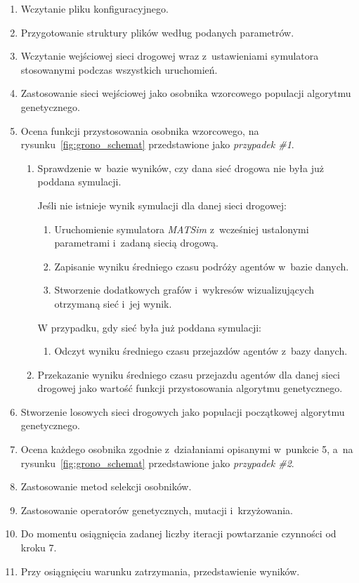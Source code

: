 \documentclass[twoside,12pt]{report}
\begin{document}
\begin{enumerate}
\item Wczytanie pliku konfiguracyjnego.
\item Przygotowanie struktury plików według podanych parametrów.
\item Wczytanie wejściowej sieci drogowej wraz z~ustawieniami symulatora stosowanymi podczas wszystkich uruchomień.
\item Zastosowanie sieci wejściowej jako osobnika wzorcowego populacji algorytmu genetycznego.
\item Ocena funkcji przystosowania osobnika wzorcowego, na rysunku~\ref{fig:grono_schemat} przedstawione jako \textit{przypadek \#1}.
\begin{enumerate}
\item Sprawdzenie w~bazie wyników, czy dana sieć drogowa nie była już poddana symulacji.

Jeśli nie istnieje wynik symulacji dla danej sieci drogowej:
\begin{enumerate}
\item Uruchomienie symulatora \textit{MATSim} z~wcześniej ustalonymi parametrami i~zadaną siecią drogową.
\item Zapisanie wyniku średniego czasu podróży agentów w~bazie danych.
\item Stworzenie dodatkowych grafów i~wykresów wizualizujących otrzymaną sieć i~jej wynik.
\end{enumerate}

W przypadku, gdy sieć była już poddana symulacji:
\begin{enumerate}
\item Odczyt wyniku średniego czasu przejazdów agentów z~bazy danych.
\end{enumerate}
\item Przekazanie wyniku średniego czasu przejazdu agentów dla danej sieci drogowej jako wartość funkcji przystosowania algorytmu genetycznego.
\end{enumerate}

\item Stworzenie losowych sieci drogowych jako populacji początkowej algorytmu genetycznego.
\item Ocena każdego osobnika zgodnie z~działaniami opisanymi w~punkcie 5, a~na rysunku~\ref{fig:grono_schemat} przedstawione jako \textit{przypadek \#2}.
\item Zastosowanie metod selekcji osobników.
\item Zastosowanie operatorów genetycznych, mutacji i~krzyżowania.
\item Do momentu osiągnięcia zadanej liczby iteracji powtarzanie czynności od kroku 7.
\item Przy osiągnięciu warunku zatrzymania, przedstawienie wyników.
\end{enumerate}
\end{document}
